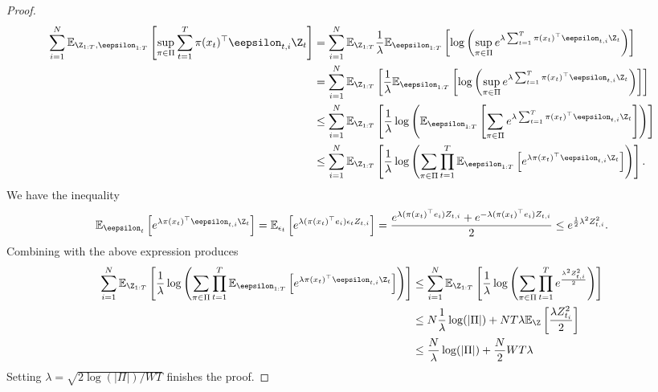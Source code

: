 \documentclass{article}
\begin{document}
\begin{proof}
  \begin{align*}
    \sum_{i=1}^N\ex_{\Z_{1:T},\eepsilon_{1:T}}\left[ \sup_{\pi\in\Pi} \sum_{t=1}^T \pi(x_t)^\top \eepsilon_{t,i} \Z_t \right]
    &=
      \sum_{i=1}^N\ex_{\Z_{1:T}}\frac{1}{\lambda}\ex_{\eepsilon_{1:T}}\left[
      \log \left(
      \sup_{\pi\in\Pi}
      e^{\lambda \sum_{t=1}^T \pi(x_t)^\top \eepsilon_{t,i} \Z_t} \right)\right]\\
    &=
      \sum_{i=1}^N
      \ex_{\Z_{1:T}}\left[\frac{1}{\lambda}
      \ex_{\eepsilon_{1:T}}\left[
      \log\left(
      \sup_{\pi\in\Pi}e^{\lambda \sum_{t=1}^T \pi(x_t)^\top \eepsilon_{t,i} \Z_t}\right)\right]
      \right]\\
    &\leq
      \sum_{i=1}^N 
      \ex_{\Z_{1:T}}\left[\frac{1}{\lambda}
      \log\left(
      \ex_{\eepsilon_{1:T}}\left[
      \sum_{\pi\in\Pi}e^{\lambda \sum_{t=1}^T \pi(x_t)^\top \eepsilon_{t,i} \Z_t}\right]\right)
      \right]\\
    &\leq
       \sum_{i=1}^N 
      \ex_{\Z_{1:T}}\left[\frac{1}{\lambda}
      \log\left(\sum_{\pi\in\Pi}\prod_{t=1}^T
      \ex_{\eepsilon_{1:T}}\left[
      e^{\lambda \pi(x_t)^\top \eepsilon_{t,i} \Z_t}\right]\right)
      \right].
  \end{align*}  
  We have the inequality
  \[
    \ex_{\eepsilon_{t}}\left[ e^{\lambda \pi(x_t)^\top \eepsilon_{t,i} \Z_t}\right]
    =
    \ex_{\epsilon_t}\left[
      e^{\lambda (\pi(x_t)^\top e_i) \epsilon_t Z_{t,i}}
    \right]
    =
    \frac{
      e^{\lambda (\pi(x_t)^\top e_i)  Z_{t,i}}
      +
      e^{-\lambda (\pi(x_t)^\top e_i) Z_{t,i}}
    }{2}
    \leq
    e^{\frac{1}{2}\lambda^2  Z_{t,i}^2}.
  \]
Combining with the above expression produces
  \begin{align*}
    \sum_{i=1}^N\ex_{\Z_{1:T}}\left[\frac{1}{\lambda}
    \log\left( \sum_{\pi\in\Pi}\prod_{t=1}^T
    \ex_{\eepsilon_{1:T}}\left[
    e^{\lambda \pi(x_t)^\top \eepsilon_{t,i} \Z_t}\right]\right)
    \right]
    &\leq
      \sum_{i=1}^N\ex_{\Z_{1:T}}\left[\frac{1}{\lambda}
      \log\left(\sum_{\pi\in\Pi}\prod_{t=1}^T
      e^{\frac{\lambda^2 Z_{t,i}^2 }{2}}
      \right)
      \right]\\
    &\leq
      N\frac{1}{\lambda}\log( \vert \Pi\vert )
      +       
      N T\lambda \ex_{\Z}\left[
      \frac{\lambda Z_{t_i}^2 }{2}
      \right]\\    
    &\leq
      \frac{N}{\lambda}\log(\vert \Pi\vert)
      +
      \frac{N}{2}W T\lambda 
  \end{align*}
  Setting $\lambda = \sqrt{2\log(\vert \Pi\vert)/W T}$ finishes the proof.
\end{proof}
\end{document}
